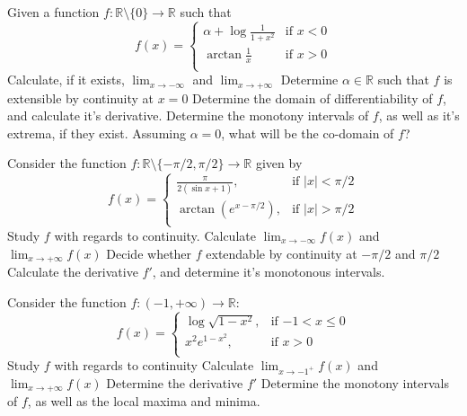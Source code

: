 \documentclass[12pt]{article}
\begin{document}
\begin{ExerciseList}
	\Exercise Given a function $f\colon \mathbb R\setminus\{ 0 \} \to \mathbb R$ such that
	$$f(x)=\begin{cases}\alpha + \log{\frac{1}{1+x^2}} & \mbox{if $x<0$} \\ \arctan{\frac{1}{x}} & \mbox{if $x>0$} \\ \end{cases}$$
	\Question Calculate, if it exists, $\lim_{x\to -\infty}$ and $\lim_{x\to +\infty}$
	\Question Determine $\alpha\in\mathbb R$ such that $f$ is extensible by continuity at $x=0$
	\Question Determine the domain of differentiability of $f$, and calculate it's derivative.
	\Question Determine the monotony intervals of $f$, as well as it's extrema, if they exist.
	\Question Assuming $\alpha=0$, what will be the co-domain of $f$?

	\Exercise Consider the function $f\colon\mathbb R\setminus\{ -\pi/2,\pi/2 \}\to\mathbb R$ given by
	$$f(x)=\begin{cases}\frac{\pi}{2(\sin{x}+1)}, & \mbox{if $|x| < \pi/2$} \\ \arctan(e^{x-\pi/2}), & \mbox{if $|x|>\pi/2$} \\ \end{cases}$$
	\Question Study $f$ with regards to continuity.
	\Question Calculate $\lim_{x\to -\infty}f(x)$ and $\lim_{x\to +\infty}f(x)$
	\Question Decide whether $f$ extendable by continuity at $-\pi/2$ and $\pi/2$
	\Question Calculate the derivative $f'$, and determine it's monotonous intervals.

	\Exercise Consider the function $f\colon (-1,+\infty)\to\mathbb R$:
	$$f(x)=\begin{cases}\log{\sqrt{1-x^2}}, & \mbox{if $-1<x\le 0$} \\ x^2e^{1-x^2}, & \mbox{if $x>0$} \\ \end{cases}$$
	\Question Study $f$ with regards to continuity
	\Question Calculate $\lim_{x\to -1^+}f(x)$ and $\lim_{x\to +\infty}f(x)$
	\Question Determine the derivative $f'$
	\Question Determine the monotony intervals of $f$, as well as the local maxima and minima.

\end{ExerciseList}
\end{document}
